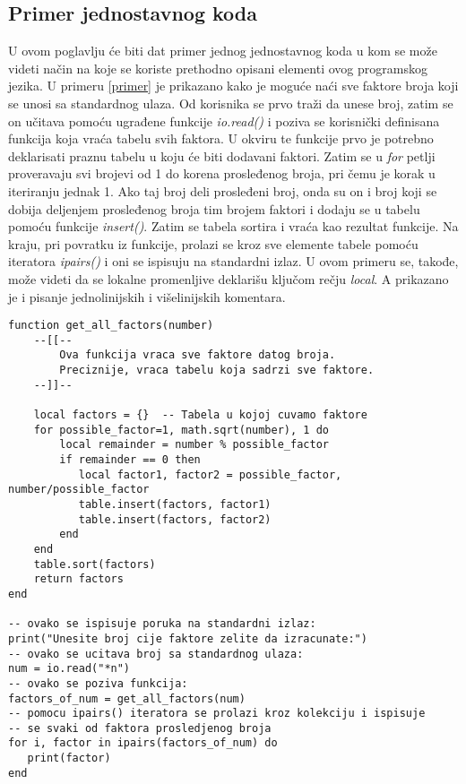 \documentclass[a4paper]{article}
\begin{document}
\subsection{Primer jednostavnog koda}
\label{sec:primer_koda}

U ovom poglavlju će biti dat primer jednog jednostavnog koda u kom se može videti način na koje se koriste prethodno opisani elementi ovog programskog jezika. U primeru \ref{primer} je prikazano kako je moguće naći sve faktore broja koji se unosi sa standardnog ulaza. Od korisnika se prvo traži da unese broj, zatim se on učitava pomoću ugrađene funkcije \textit{io.read()} i poziva se korisnički definisana funkcija koja vraća tabelu svih faktora. U okviru te funkcije prvo je potrebno deklarisati praznu tabelu u koju će biti dodavani faktori. Zatim se u \textit{for} petlji proveravaju svi brojevi od 1 do korena prosleđenog broja, pri čemu je korak u iteriranju jednak 1. Ako taj broj deli prosleđeni broj, onda su on i broj koji se dobija deljenjem prosleđenog broja tim brojem faktori i dodaju se u tabelu pomoću funkcije \textit{insert()}. Zatim se tabela sortira i vraća kao rezultat funkcije. Na kraju, pri povratku iz funkcije, prolazi se kroz sve elemente tabele pomoću iteratora \textit{ipairs()} i oni se ispisuju na standardni izlaz. U ovom primeru se, takođe, može videti da se lokalne promenljive deklarišu ključom rečju \textit{local}. A prikazano je i pisanje jednolinijskih i višelinijskih komentara.

\begin{lstlisting}[caption={Primer izračunavanja faktora broja},frame=single, label=primer]
function get_all_factors(number)
    --[[--
    	Ova funkcija vraca sve faktore datog broja.
    	Preciznije, vraca tabelu koja sadrzi sve faktore.
    --]]--
    
    local factors = {}  -- Tabela u kojoj cuvamo faktore
    for possible_factor=1, math.sqrt(number), 1 do
        local remainder = number % possible_factor        
        if remainder == 0 then
           local factor1, factor2 = possible_factor, number/possible_factor
           table.insert(factors, factor1)
           table.insert(factors, factor2) 
        end
    end
    table.sort(factors)
    return factors
end

-- ovako se ispisuje poruka na standardni izlaz:
print("Unesite broj cije faktore zelite da izracunate:")
-- ovako se ucitava broj sa standardnog ulaza:
num = io.read("*n")
-- ovako se poziva funkcija:
factors_of_num = get_all_factors(num)
-- pomocu ipairs() iteratora se prolazi kroz kolekciju i ispisuje 
-- se svaki od faktora prosledjenog broja
for i, factor in ipairs(factors_of_num) do
   print(factor) 
end
\end{lstlisting}
\end{document}
